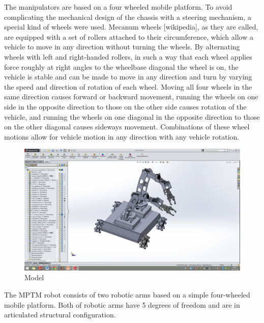 The manipulators are based on a four wheeled mobile platform. To avoid complicating the mechanical design of the chassis with a steering mechanism, a special kind of wheels were used. Mecanum wheels [wikipedia], as they are called, are equipped with a set of rollers attached to their circumference, which allow a vehicle to move in any direction without turning the wheels. By alternating wheels with left and right-handed rollers, in such a way that each wheel applies force roughly at right angles to the wheelbase diagonal the wheel is on, the vehicle is stable and can be made to move in any direction and turn by varying the speed and direction of rotation of each wheel. Moving all four wheels in the same direction causes forward or backward movement, running the wheels on one side in the opposite direction to those on the other side causes rotation of the vehicle, and running the wheels on one diagonal in the opposite direction to those on the other diagonal causes sideways movement. Combinations of these wheel motions allow for vehicle motion in any direction with any vehicle rotation.

\begin{figure}[H]
\centering
\includegraphics[trim=21cm 5cm 18cm 5cm, clip=true, totalheight=0.5\textheight]{fig/model}
\caption{Model}
\label{fig:model}
\end{figure}

The MPTM robot consists of two robotic arms based on a simple four-wheeled mobile platform. Both of robotic arms have 5 degrees of freedom and are in articulated structural configuration. 



